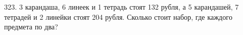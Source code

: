 323. 3 карандаша, 6 линеек и 1 тетрадь стоят 132 рубля, а 5 карандашей, 7 тетрадей и 2 линейки стоят 204 рубля. Сколько стоит набор, где каждого предмета по два?\\
